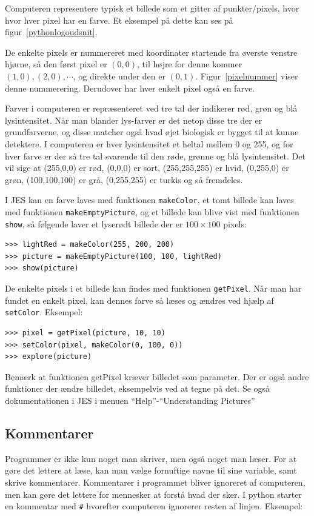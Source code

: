 \documentclass[10pt]{article}
\begin{document}
Computeren representere typisk et billede som et gitter af punkter/pixels, hvor hvor hver pixel har en farve. Et eksempel på dette kan ses på figur~\ref{pythonlogoudsnit}.

De enkelte pixels er nummereret med koordinater startende fra øverste venstre hjørne, så den først pixel er $(0,0)$, til højre for denne kommer $(1,0), (2,0), \cdots$, og direkte under den er $(0,1)$. Figur~\ref{pixelnummer} viser denne nummerering.
Derudover har hver enkelt pixel også en farve.

Farver i computeren er repræsenteret ved tre tal der indikerer rød, grøn og blå lysintensitet. 
Når man blander lys-farver er det netop disse tre der er grundfarverne, og disse matcher også hvad øjet biologisk er bygget til at kunne detektere.
I computeren er hver lysintensitet et heltal mellem 0 og 255, og for hver farve er der så tre tal svarende til den røde, grønne og blå lysintensitet. Det vil sige at (255,0,0) er rød, (0,0,0) er sort, (255,255,255) er hvid, (0,255,0) er grøn, (100,100,100) er grå, (0,255,255) er turkis og så fremdeles.

I JES kan en farve laves med funktionen \verb|makeColor|, et tomt billede kan laves med funktionen \verb|makeEmptyPicture|, og et billede kan blive vist med funktionen \verb|show|, så følgende laver et lyserødt billede der er $100\times 100$ pixels:
\begin{verbatim}
>>> lightRed = makeColor(255, 200, 200)
>>> picture = makeEmptyPicture(100, 100, lightRed)
>>> show(picture)
\end{verbatim}

De enkelte pixels i et billede kan findes med funktionen \verb|getPixel|. Når man har fundet en enkelt pixel, kan dennes farve så læses og ændres ved hjælp af \verb|setColor|. Eksempel:
\begin{verbatim}
>>> pixel = getPixel(picture, 10, 10)
>>> setColor(pixel, makeColor(0, 100, 0))
>>> explore(picture)
\end{verbatim}

Bemærk at funktionen getPixel kræver billedet som parameter. Der er også andre funktioner der ændre billedet, eksempelvis ved at tegne på det. Se også dokumentationen i JES i menuen ``Help''-``Understanding Pictures''

\subsection{Kommentarer}

Programmer er ikke kun noget man skriver,
men også noget man læser.
For at gøre det lettere at læse,
kan man vælge fornuftige navne til sine variable,
samt skrive kommentarer.
Kommentarer i programmet bliver ignoreret af computeren,
men kan gøre det lettere for mennesker at
forstå hvad der sker. I python starter en kommentar med \verb|#| hvorefter computeren ignorerer resten af linjen. Eksempel:

\end{document}
